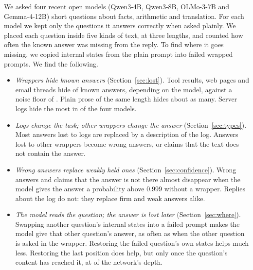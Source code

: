 We asked four recent open models (Qwen3-4B, Qwen3-8B, OLMo-3-7B and Gemma-4-12B) \NItems{} short questions about facts, arithmetic and translation. For each model we kept only the questions it answers correctly when asked plainly. We placed each question inside five kinds of text, at three lengths, and counted how often the known answer was missing from the reply. To find where it goes missing, we copied internal states from the plain prompt into failed wrapped prompts. We find the following.
\begin{itemize}
\item \emph{Wrappers hide known answers} (Section~\ref{sec:lost}). Tool results, web pages and email threads hide \LostStruct{} of known answers, depending on the model, against a noise floor of \FloorLost{}. Plain prose of the same length hides about as many. Server logs hide the most in \NLogWorstWord{} of the four models.
\item \emph{Logs change the task; other wrappers change the answer} (Section~\ref{sec:types}). Most answers lost to logs are replaced by a description of the log. Answers lost to other wrappers become wrong answers, or claims that the text does not contain the answer.
\item \emph{Wrong answers replace weakly held ones} (Section~\ref{sec:confidence}). Wrong answers and claims that the answer is not there almost disappear when the model gives the answer a probability above 0.999 without a wrapper. Replies about the log do not: they replace firm and weak answers alike.
\item \emph{The model reads the question; the answer is lost later} (Section~\ref{sec:where}). Swapping another question's internal states into a failed prompt makes the model give that other question's answer, as often as when the other question is asked in the wrapper. Restoring the failed question's own states helps much less. Restoring the last position does help, but only once the question's content has reached it, at \HandoffDepth{} of the network's depth.
\end{itemize}
